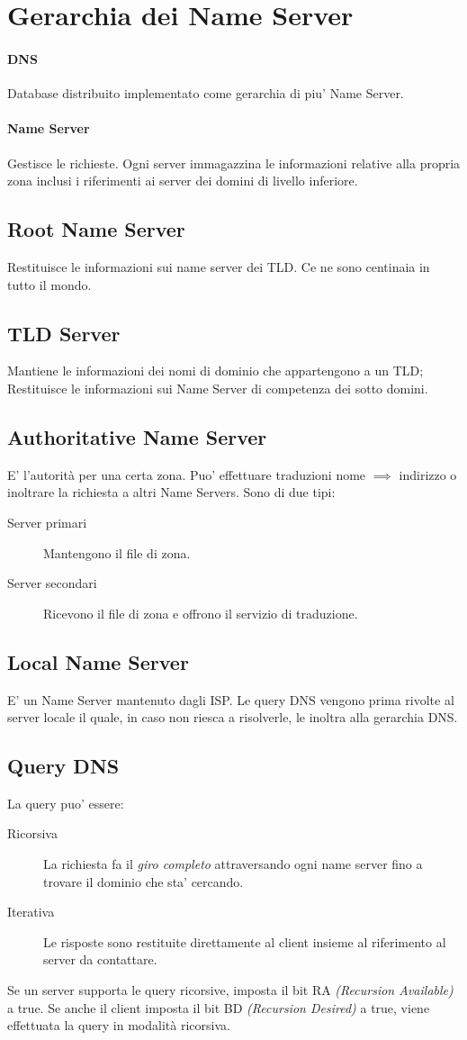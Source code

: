 \section{Gerarchia dei Name Server}
\paragraph{DNS} Database distribuito implementato come gerarchia di piu' Name Server.
\paragraph{Name Server} Gestisce le richieste.
Ogni server immagazzina le informazioni relative alla propria zona inclusi i riferimenti ai server dei domini di livello inferiore.
\subsection{Root Name Server}
Restituisce le informazioni sui name server dei TLD. Ce ne sono centinaia in tutto il mondo.
\subsection{TLD Server}
Mantiene le informazioni dei nomi di dominio che appartengono a un TLD; Restituisce le informazioni sui Name Server di competenza dei sotto domini.
\subsection{Authoritative Name Server} %
E' l'autorità per una certa zona. Puo' effettuare traduzioni nome $\implies$ indirizzo o inoltrare la richiesta a altri Name Servers.
Sono di due tipi:
\begin{description}
    \item[Server primari] Mantengono il file di zona.
    \item[Server secondari] Ricevono il file di zona e offrono il servizio di traduzione. 
\end{description}
\subsection{Local Name Server}
E' un Name Server mantenuto dagli ISP.
Le query DNS vengono prima rivolte al server locale il quale, in caso non riesca a risolverle, le inoltra alla gerarchia DNS.
\subsection{Query DNS}
La query puo' essere:
\begin{description}
    \item[Ricorsiva] La richiesta fa il \textit{giro completo} attraversando ogni name server fino a trovare il dominio che sta' cercando.
    \item[Iterativa] Le risposte sono restituite direttamente al client insieme al riferimento al server da contattare.
\end{description}
Se un server supporta le query ricorsive, imposta il bit RA \textit{(Recursion Available)} a true.
Se anche il client imposta il bit BD \textit{(Recursion Desired)} a true, viene effettuata la query in modalità ricorsiva.
